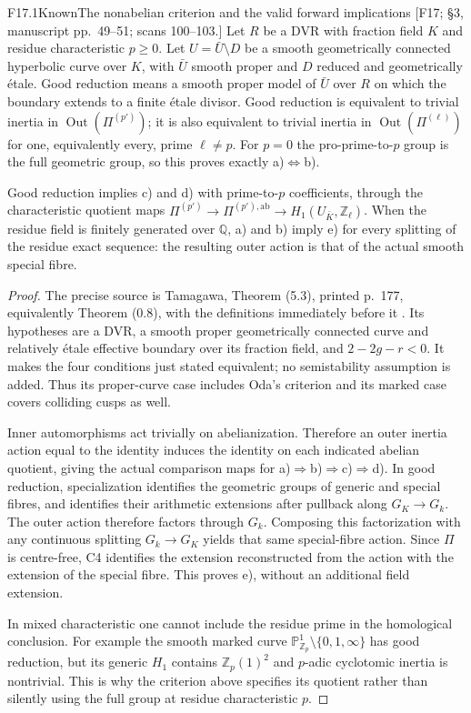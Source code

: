 \begin{result}{F17.1}{Known}{The nonabelian criterion and the valid forward implications}
\textup{[F17; \S3, manuscript pp.\ 49--51; scans 100--103.]}
Let $R$ be a DVR with fraction field $K$ and residue characteristic
$p\geq0$. Let $U=\bar U\setminus D$ be a smooth geometrically connected
hyperbolic curve over $K$, with $\bar U$ smooth proper and $D$ reduced
and geometrically \'etale. Good reduction means a smooth proper model
of $\bar U$ over $R$ on which the boundary extends to a finite
\'etale divisor. Good reduction is equivalent to trivial inertia in
$\operatorname{Out}(\Pi^{(p')})$; it is also equivalent to trivial
inertia in $\operatorname{Out}(\Pi^{(\ell)})$ for one, equivalently
every, prime $\ell\ne p$. For $p=0$ the pro-prime-to-$p$ group is the
full geometric group, so this proves exactly a)$\Leftrightarrow$b).

Good reduction implies c) and d) with prime-to-$p$ coefficients, through
the characteristic quotient maps
$\Pi^{(p')}\to\Pi^{(p'),\mathrm{ab}}\to H_1(U_{\bar K},\mathbb Z_\ell)$.
When the residue field is finitely generated over $\mathbb Q$, a) and
b) imply e) for every splitting of the residue exact sequence: the
resulting outer action is that of the actual smooth special fibre.
\end{result}

\begin{proof}
The precise source is Tamagawa, Theorem (5.3), printed p.\ 177,
equivalently Theorem (0.8), with the definitions immediately before
it \cite{CF_Tamagawa1997}. Its hypotheses are a DVR, a smooth proper
geometrically connected curve and relatively \'etale effective boundary
over its fraction field, and $2-2g-r<0$. It makes the four conditions
just stated equivalent; no semistability assumption is added.
Thus its proper-curve case includes Oda's criterion and its marked
case covers colliding cusps as well.

Inner automorphisms act trivially on abelianization. Therefore an
outer inertia action equal to the identity induces the identity on
each indicated abelian quotient, giving the actual comparison maps
for a)$\Rightarrow$b)$\Rightarrow$c)$\Rightarrow$d).
In good reduction, specialization identifies the geometric groups
of generic and special fibres, and identifies their arithmetic
extensions after pullback along $G_K\to G_k$. The outer action
therefore factors through $G_k$. Composing this factorization with
any continuous splitting $G_k\to G_K$ yields that same special-fibre
action. Since $\Pi$ is centre-free, C4 identifies the extension
reconstructed from the action with the extension of the special
fibre. This proves e), without an additional field extension.

In mixed characteristic one cannot include the residue prime in the
homological conclusion. For example the smooth marked curve
$\mathbb P^1_{\mathbb Z_p}\setminus\{0,1,\infty\}$ has good
reduction, but its generic $H_1$ contains $\mathbb Z_p(1)^2$ and
$p$-adic cyclotomic inertia is nontrivial. This is why the criterion
above specifies its quotient rather than silently using the full
group at residue characteristic $p$.
\end{proof}

